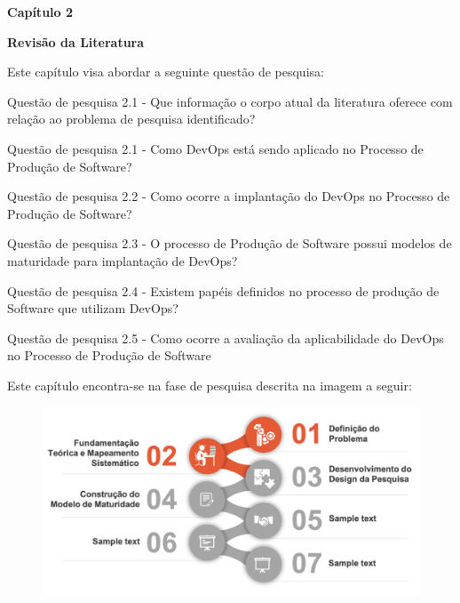 \newpage
\pagestyle{empty}

\begin{center}
\textbf{\Huge Capítulo 2}
\end{center}
\begin{center}
\textbf{\Huge Revisão da Literatura}
\end{center}
\noindent\makebox[\linewidth]{\rule{\textwidth}{1pt}} 
\begin{flushleft}
Este capítulo visa abordar a seguinte questão de pesquisa:

Questão de pesquisa 2.1 - Que informação o corpo atual da literatura oferece com relação ao problema de pesquisa identificado?

Questão de pesquisa 2.1 - Como DevOps está sendo aplicado no Processo de Produção de Software? 

Questão de pesquisa 2.2 - Como ocorre a implantação do DevOps no Processo de Produção de Software?

Questão de pesquisa 2.3 - O processo de Produção de Software possui modelos de maturidade para implantação de DevOps?

Questão de pesquisa 2.4 - Existem papéis definidos no processo de produção de Software que utilizam DevOps?

Questão de pesquisa 2.5 - Como ocorre a avaliação da aplicabilidade do DevOps no Processo de Produção de Software

\end{flushleft}
\noindent\makebox[\linewidth]{\rule{\textwidth}{1pt}} 

Este capítulo encontra-se na fase de pesquisa descrita na imagem a seguir:
\begin{figure}[ht]
\centering
\includegraphics[width=15cm]{images/metodologia-cap2.png}
\label{fig:metodologia-cap2}
\end{figure}
